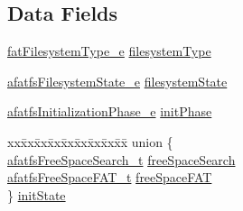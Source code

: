 \subsection*{Data Fields}
\begin{DoxyCompactItemize}
\item 
\hyperlink{fat__standard_8h_a58ef25557985bc9642bacb9ae86f799b}{fat\+Filesystem\+Type\+\_\+e} \hyperlink{structafatfs__t_a81962c5f439eab4e7dc72f412ba02c93}{filesystem\+Type}
\item 
\hyperlink{asyncfatfs_8h_a4e09e2b8e31fc45306aa820a9fca3bcd}{afatfs\+Filesystem\+State\+\_\+e} \hyperlink{structafatfs__t_a322fbae2869c38a76d5f584f27c4dac6}{filesystem\+State}
\item 
\hyperlink{asyncfatfs_8c_a1bd9d7b44922be94e2bf42c9a982b7ab}{afatfs\+Initialization\+Phase\+\_\+e} \hyperlink{structafatfs__t_ad5ca858db751ec7a7b030252d01a1893}{init\+Phase}
\item 
\begin{tabbing}
xx\=xx\=xx\=xx\=xx\=xx\=xx\=xx\=xx\=\kill
union \{\\
\>\hyperlink{structafatfsFreeSpaceSearch__t}{afatfsFreeSpaceSearch\_t} \hyperlink{structafatfs__t_a6787bfa434d2316ffdd550ac6357207a}{freeSpaceSearch}\\
\>\hyperlink{structafatfsFreeSpaceFAT__t}{afatfsFreeSpaceFAT\_t} \hyperlink{structafatfs__t_ac3b0a4c2e98943ad49102e1397ba54f4}{freeSpaceFAT}\\
\} \hyperlink{structafatfs__t_a0c464474083c107774adfa914841a661}{initState}\\


\end{tabbing}
\end{DoxyCompactItemize}
